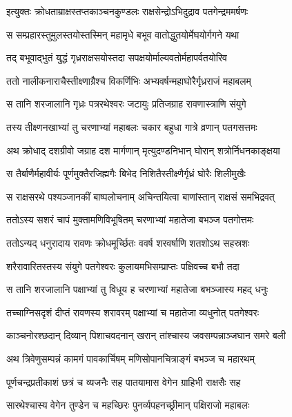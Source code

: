 
\twolineshloka
{इत्युक्तः क्रोधताम्राक्षस्तप्तकाञ्चनकुण्डलः}
{राक्षसेन्द्रोऽभिदुद्राव पतगेन्द्रममर्षणः} %

\twolineshloka
{स सम्प्रहारस्तुमुलस्तयोस्तस्मिन् महामृधे}
{बभूव वातोद्धुतयोर्मेघयोर्गगने यथा} %

\twolineshloka
{तद् बभूवाद्भुतं युद्धं गृध्रराक्षसयोस्तदा}
{सपक्षयोर्माल्यवतोर्महापर्वतयोरिव} %

\twolineshloka
{ततो नालीकनाराचैस्तीक्ष्णाग्रैश्च विकर्णिभिः}
{अभ्यवर्षन्महाघोरैर्गृध्रराजं महाबलम्} %

\twolineshloka
{स तानि शरजालानि गृध्रः पत्ररथेश्वरः}
{जटायुः प्रतिजग्राह रावणास्त्राणि संयुगे} %

\twolineshloka
{तस्य तीक्ष्णनखाभ्यां तु चरणाभ्यां महाबलः}
{चकार बहुधा गात्रे व्रणान् पतगसत्तमः} %

\twolineshloka
{अथ क्रोधाद् दशग्रीवो जग्राह दश मार्गणान्}
{मृत्युदण्डनिभान् घोरान् शत्रोर्निधनकाङ्क्षया} %

\twolineshloka
{स तैर्बाणैर्महावीर्यः पूर्णमुक्तैरजिह्मगैः}
{बिभेद निशितैस्तीक्ष्णैर्गृध्रं घोरैः शिलीमुखैः} %

\twolineshloka
{स राक्षसरथे पश्यञ्जानकीं बाष्पलोचनाम्}
{अचिन्तयित्वा बाणांस्तान् राक्षसं समभिद्रवत्} %

\twolineshloka
{ततोऽस्य सशरं चापं मुक्तामणिविभूषितम्}
{चरणाभ्यां महातेजा बभञ्ज पतगोत्तमः} %

\twolineshloka
{ततोऽन्यद् धनुरादाय रावणः क्रोधमूर्च्छितः}
{ववर्ष शरवर्षाणि शतशोऽथ सहस्रशः} %

\twolineshloka
{शरैरावारितस्तस्य संयुगे पतगेश्वरः}
{कुलायमभिसम्प्राप्तः पक्षिवच्च बभौ तदा} %

\twolineshloka
{स तानि शरजालानि पक्षाभ्यां तु विधूय ह}
{चरणाभ्यां महातेजा बभञ्जास्य महद् धनुः} %

\twolineshloka
{तच्चाग्निसदृशं दीप्तं रावणस्य शरावरम्}
{पक्षाभ्यां च महातेजा व्यधुनोत् पतगेश्वरः} %

\twolineshloka
{काञ्चनोरश्छदान् दिव्यान् पिशाचवदनान् खरान्}
{तांश्चास्य जवसम्पन्नाञ्जघान समरे बली} %

\twolineshloka
{अथ त्रिवेणुसम्पन्नं कामगं पावकार्चिषम्}
{मणिसोपानचित्राङ्गं बभञ्ज च महारथम्} %

\twolineshloka
{पूर्णचन्द्रप्रतीकाशं छत्रं च व्यजनैः सह}
{पातयामास वेगेन ग्राहिभी राक्षसैः सह} %

\twolineshloka
{सारथेश्चास्य वेगेन तुण्डेन च महच्छिरः}
{पुनर्व्यपहनच्छ्रीमान् पक्षिराजो महाबलः} %

